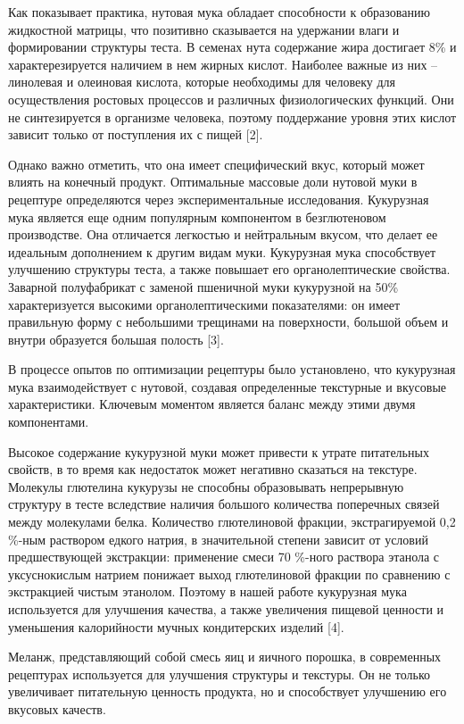 \begin{multicols}{2}
Как показывает практика, нутовая мука обладает способности к образованию
жидкостной матрицы, что позитивно сказывается на удержании влаги и
формировании структуры теста. В семенах нута содержание жира достигает
8\% и характерезируется наличием в нем жирных кислот. Наиболее важные из
них -- линолевая и олеиновая кислота, которые необходимы для человеку
для осуществления ростовых процессов и различных физиологических
функций. Они не синтезируется в организме человека, поэтому поддержание
уровня этих кислот зависит только от поступления их с пищей {[}2{]}.

Однако важно отметить, что она имеет специфический вкус, который может
влиять на конечный продукт. Оптимальные массовые доли нутовой муки в
рецептуре определяются через экспериментальные исследования. Кукурузная
мука является еще одним популярным компонентом в безглютеновом
производстве. Она отличается легкостью и нейтральным вкусом, что делает
ее идеальным дополнением к другим видам муки. Кукурузная мука
способствует улучшению структуры теста, а также повышает его
органолептические свойства. Заварной полуфабрикат с заменой пшеничной
муки кукурузной на 50\% характеризуется высокими органолептическими
показателями: он имеет правильную форму с небольшими трещинами на
поверхности, большой объем и внутри образуется большая полость {[}3{]}.

В процессе опытов по оптимизации рецептуры было установлено, что
кукурузная мука взаимодействует с нутовой, создавая определенные
текстурные и вкусовые характеристики. Ключевым моментом является баланс
между этими двумя компонентами.

Высокое содержание кукурузной муки может привести к утрате питательных
свойств, в то время как недостаток может негативно сказаться на
текстуре. Молекулы глютелина кукурузы не способны образовывать
непрерывную структуру в тесте вследствие наличия большого количества
поперечных связей между молекулами белка. Количество глютелиновой
фракции, экстрагируемой 0,2 \%-ным раствором едкого натрия, в
значительной степени зависит от условий предшествующей экстракции:
применение смеси 70 \%-ного раствора этанола с уксуснокислым натрием
понижает выход глютелиновой фракции по сравнению с экстракцией чистым
этанолом. Поэтому в нашей работе кукурузная мука используется для
улучшения качества, а также увеличения пищевой ценности и уменьшения
калорийности мучных кондитерских изделий {[}4{]}.

Меланж, представляющий собой смесь яиц и яичного порошка, в современных
рецептурах используется для улучшения структуры и текстуры. Он не только
увеличивает питательную ценность продукта, но и способствует улучшению
его вкусовых качеств.


\end{multicols}
